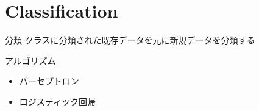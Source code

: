 \documentclass[dvipdfmx,platex]{beamer}
\begin{document}
\section{Classification}
\begin{frame}{{\mgfamily 分類}}
  クラスに分類された既存データを元に新規データを分類する

  \vspace{20pt}
  アルゴリズム
  \begin{itemize}
  \item パーセプトロン
  \item ロジスティック回帰
  \end{itemize}
\end{frame}
\end{document}
